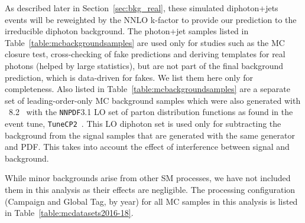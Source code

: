 As described later in Section~\ref{sec:bkg_real}, these simulated diphoton+jets events will be reweighted by the NNLO k-factor to provide our prediction to the irreducible diphoton background. 
The photon+jet samples listed in Table~\ref{table:mcbackgroundsamples} are used only for studies such as the MC closure test, cross-checking of fake predictions and deriving templates for real photons (helped by large statistics), but are not part of the final background prediction, which is data-driven for fakes. We list them here only for completeness. Also listed in Table~\ref{table:mcbackgroundsamples} are a separate set of leading-order-only MC background samples which were also generated with \PYTHIA~8.2~\cite{Sjostrand:2008za} with the \texttt{NNPDF}3.1 LO set of parton distribution functions as found in the event tune, \texttt{TuneCP2}~\cite{Sirunyan:2019dfx}. This LO diphoton set is used only for subtracting the background from the signal samples that are generated with the same generator and PDF. This takes into account the effect of interference between signal and background. 

While minor backgrounds arise from other SM processes, we have not included them in this analysis as their effects are negligible. The processing configuration (Campaign and Global Tag, by year) for all MC samples in this analysis is listed in Table~\ref{table:mcdatasets2016-18}.







